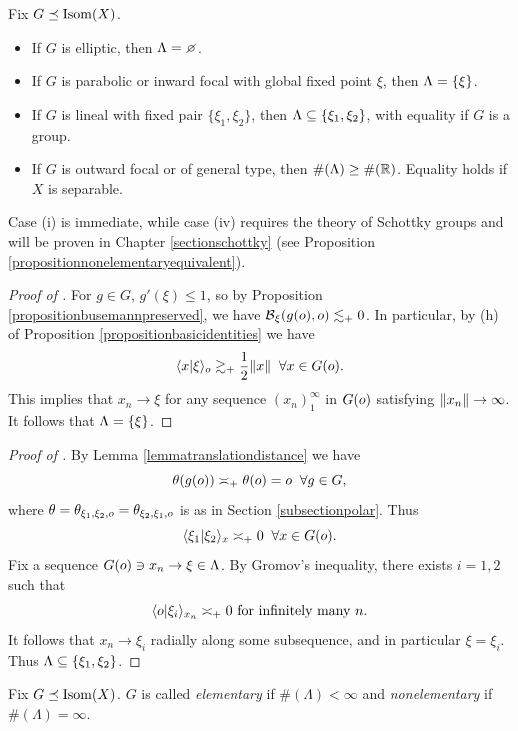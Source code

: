 \begin{proposition}
\label{propositioncardinalitylimitset}
Fix $G\preceq\operatorname{Isom}(X)$.
\begin{itemize}
\item[(i)] If $G$ is elliptic, then $\LambdaG = \emptyset$.
\item[(ii)] If $G$ is parabolic or inward focal with global fixed point $\xi$, then $\Lambda = \{\xi\}$.
\item[(iii)] If $G$ is lineal with fixed pair $\{\xi_1,\xi_2\}$, then $\Lambda \subseteq \{\xi_1,\xi_2\}$, with equality if $G$ is a group.
\item[(iv)] If $G$ is outward focal or of general type, then $\#(\LambdaG) \geq \#(\R)$. Equality holds if $X$ is separable.
\end{itemize}
\end{proposition}
Case (i) is immediate, while case (iv) requires the theory of Schottky groups and will be proven in Chapter \ref{sectionschottky} (see Proposition \ref{propositionnonelementaryequivalent}).
\begin{proof}[Proof of ]
For $g\in G$, $g'(\xi) \leq 1$, so by Proposition \ref{propositionbusemannpreserved}, we have $\operatorname{\mathcal B}_\xi(g(o),o) \lesssim_+ 0$. In particular, by (h) of Proposition \ref{propositionbasicidentities} we have
\[
\langle x | \xi \rangle_o \gtrsim_+ \frac12 \|x\| \;\;\forall x\in G(o).
\]
This implies that $x_n\to \xi$ for any sequence $(x_n)_1^\infty$ in $G(o)$ satisfying $\|x_n\|\to \infty$. It follows that $\Lambda = \{\xi\}$.
\end{proof}
\begin{proof}[Proof of ]
By Lemma \ref{lemmatranslationdistance} we have
\[
\theta(g(o)) \asymp_+ \theta(o) = o \;\;\forall g\in G,
\]
where $\theta = \theta_{\xi_1,\xi_2,o} = \theta_{\xi_2,\xi_1,o}$ is as in Section \ref{subsectionpolar}. Thus
\[
\langle \xi_1 | \xi_2 \rangle_x \asymp_+ 0 \;\;\forall x\in G(o).
\]
Fix a sequence $G(o)\ni x_n \to \xi\in\Lambda$. By Gromov's inequality, there exists $i = 1,2$ such that
\[
\langle o | \xi_i \rangle_{x_n} \asymp_+ 0 \textup{ for infinitely many $n$.}
\]
It follows that $x_n \to \xi_i$ radially along some subsequence, and in particular $\xi = \xi_i$. Thus $\Lambda \subseteq \{\xi_1,\xi_2\}$.
\end{proof}

\begin{definition}
\label{definitionelementary}
Fix $G\preceq\operatorname{Isom}(X)$. $G$ is called \emph{elementary} if $\#(\Lambda) < \infty$ and \emph{nonelementary} if $\#(\Lambda) = \infty$.
\end{definition}

